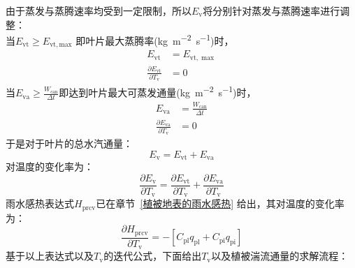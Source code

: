 由于蒸发与蒸腾速率均受到一定限制，所以$E_{\mathrm{v}}$将分别针对蒸发与蒸腾速率进行调整：\\
当$ E_{\mathrm{vt}} \geqslant E_{\mathrm{vt,max}}$ 即叶片最大蒸腾率(\unit{kg.m^{-2}.s^{-1}})时，
\begin{equation}
  \begin{aligned}
    E_{\mathrm{vt}} &=  E_{\mathrm{vt, \max }} \\[1ex]
    \frac{\partial E_{\mathrm{vt}}}{\partial T_{\mathrm{v}}} &= 0
  \end{aligned}
\end{equation}
当$E_{\mathrm{va}} \geqslant \frac{W_{\mathrm{can}}}{\Delta t}$即达到叶片最大可蒸发通量(\unit{kg.m^{-2}.s^{-1}})时，
\begin{equation}
  \begin{aligned}
    E_{\mathrm{va}} &= \frac{W_{\mathrm{can}}}{\Delta t} \\[1ex]
    \frac{\partial E_{\mathrm{va}}}{\partial T_{\mathrm{v}}} &= 0
  \end{aligned}
\end{equation}
于是对于叶片的总水汽通量：
\begin{equation}
  E_{\mathrm{v}} = E_{\mathrm{vt}}+E_{\mathrm{va}}
\end{equation}
对温度的变化率为：
\begin{equation}
  \frac{\partial E_{\mathrm{v}}}{\partial T_{\mathrm{v}}} = \frac{\partial E_{\mathrm{vt}}}{\partial T_{\mathrm{v}}}+\frac{\partial E_{\mathrm{va}}}{\partial T_{\mathrm{v}}}
\end{equation}
雨水感热表达式$H_{\mathrm{prcv}}$已在章节~\ref{植被地表的雨水感热} 给出，其对温度的变化率为：
\begin{equation}
  \frac{\partial H_{\mathrm{prcv}}}{\partial T_{\mathrm{v}}}=-\left[C_{\mathrm{p l}} q_{\mathrm{p l}}+C_{\mathrm{p i}} q_{\mathrm{p i}}\right]
\end{equation}
基于以上表达式以及$T_{\mathrm v}$的迭代公式，下面给出$T_{\mathrm v}$以及植被湍流通量的求解流程：
